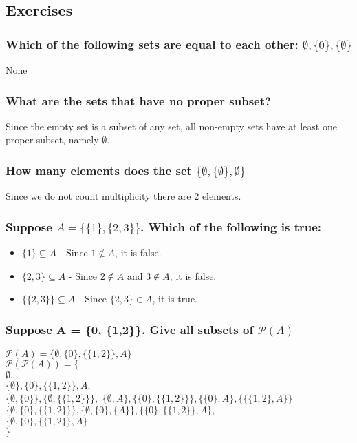 \subsection{Exercises}
\subsubsection{Which of the following sets are equal to each other: $\emptyset, \{0\}, \{\emptyset\}$}
None

\subsubsection{What are the sets that have no proper subset?}
Since the empty set is a subset of any set, all non-empty sets have
at least one proper subset, namely $\emptyset$.

\subsubsection{How many elements does the set $\{\emptyset, \{\emptyset\}, \emptyset\}$}
Since we do not count multiplicity there are 2 elements.

\subsubsection{Suppose $A = \{\{1\},\{2,3\}\}$. Which of the following is true:}
\begin{itemize}
    \item $\{1\} \subseteq A$ - Since $1 \not\in A$, it is false.
    \item $\{2,3\} \subseteq A$ - Since $2 \not\in A$ and $3 \not\in A$, it is false.
    \item $\{\{2,3\}\} \subseteq A$ - Since $\{2,3\} \in A$, it is true.
\end{itemize}

\subsubsection{Suppose A = \{0, \{1,2\}\}. Give all subsets of $\mathcal{P}(A)$}
$\mathcal{P}(A) = \{\emptyset, \{0\},\{\{1,2\}\}, A\}$  \\
$\mathcal{P}(\mathcal{P}(A)) = \{$ \\ 
$\emptyset,$ \\
$\{\emptyset\}, \{0\}, \{\{1,2\}\}, A,$\\
$\{\emptyset, \{0\}\}, \{\emptyset, \{\{1,2\}\}\},$
$\{\emptyset, A\}, \{\{0\}, \{\{1,2\}\}\}, \{\{0\}, A\}, \{\{\{1,2\}, A\}\}$ \\
$\{\emptyset, \{0\}, \{\{1,2\}\}\}, \{\emptyset,\{0\},\{A\}\}, \{\{0\},\{\{1,2\}\}, A\},$\\
$\{\emptyset, \{0\}, \{\{1,2\}\}, A\}$\\
$ \}$

